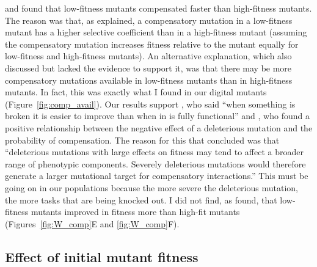\begin{doublespace}
\citet{moo00} and \citet{san05}
found that low-fitness mutants compensated faster than high-fitness mutants.
%
The reason was that, as \citet{moo00} explained,
a compensatory mutation in a low-fitness mutant
has a higher selective coefficient than in a high-fitness mutant
(assuming the compensatory mutation increases fitness relative to the mutant
equally for low-fitness and high-fitness mutants).
%
An alternative explanation,
which \citet{moo00} also discussed
but lacked the evidence to support it,
was that there may be more compensatory mutations available
in low-fitness mutants than in high-fitness mutants.
%
In fact, this was exactly what I found
in our digital mutants (Figure~\ref{fig:comp_avail}).
%
Our results support \citet{whi03},
who said ``when something is broken it is easier to improve than
when in is fully functional'' and \citet{poo05b},
who found a positive relationship between the negative effect
of a deleterious mutation and the probability of compensation.
%
The reason for this that \citet{poo05b} concluded was that
``deleterious mutations with large effects
on fitness may tend to affect a broader range of phenotypic components.
Severely deleterious mutations would therefore generate a larger
mutational target for compensatory interactions.''
%
This must be going on in our populations because the more severe
the deleterious mutation, the more tasks that are being knocked out.
%
I did not find, as \citet{san05} found,
that low-fitness mutants improved in fitness more than high-fit mutants
(Figures~\ref{fig:W_comp}E and \ref{fig:W_comp}F).



\subsection{Effect of initial mutant fitness}


\end{doublespace}
